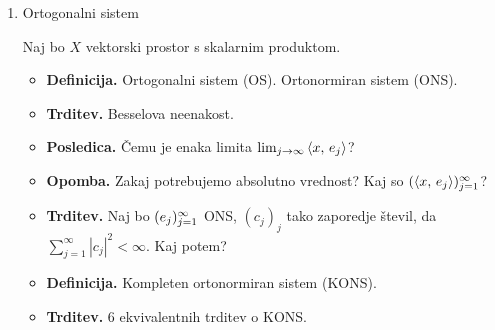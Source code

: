 \begin{enumerate}
    \item Ortogonalni sistem
    
    Naj bo \(X\) vektorski prostor s skalarnim produktom.
    \begin{itemize}
        \item \textbf{Definicija.} Ortogonalni sistem (OS). Ortonormiran sistem (ONS).
        \item \textbf{Trditev.} Besselova neenakost. \todo{*}
        \item \textbf{Posledica.} Čemu je enaka limita \(\lim_{j \to \infty} \left\langle x, \, e_j \right\rangle\)?
        \item \textbf{Opomba.} Zakaj potrebujemo absolutno vrednost? Kaj so \((\left\langle x, \, e_j \right\rangle)_{j=1}^\infty\)?
        \item \textbf{Trditev.} Naj bo \((e_j)_{j=1}^\infty\) ONS, \((c_j)_j\) tako zaporedje števil, da \(\sum_{j=1}^{\infty} |c_j|^2 < \infty\). Kaj potem?
        \item \textbf{Definicija.} Kompleten ortonormiran sistem (KONS).
        \item \textbf{Trditev.} 6 ekvivalentnih trditev o KONS. \todo{*}
    \end{itemize}
\end{enumerate}